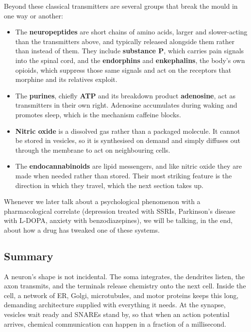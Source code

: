 \documentclass[11pt]{article}
\begin{document}
Beyond these classical transmitters are several groups that break the mould in one way or another:

\begin{itemize}
    \item The \textbf{neuropeptides} are short chains of amino acids, larger and slower-acting than the transmitters above, and typically released alongside them rather than instead of them. They include \textbf{substance P}, which carries pain signals into the spinal cord, and the \textbf{endorphins} and \textbf{enkephalins}, the body's own opioids, which suppress those same signals and act on the receptors that morphine and its relatives exploit.
    \item The \textbf{purines}, chiefly \textbf{ATP} and its breakdown product \textbf{adenosine}, act as transmitters in their own right. Adenosine accumulates during waking and promotes sleep, which is the mechanism caffeine blocks.
    \item \textbf{Nitric oxide} is a dissolved gas rather than a packaged molecule. It cannot be stored in vesicles, so it is synthesised on demand and simply diffuses out through the membrane to act on neighbouring cells.
    \item The \textbf{endocannabinoids} are lipid messengers, and like nitric oxide they are made when needed rather than stored. Their most striking feature is the direction in which they travel, which the next section takes up.
\end{itemize}

Whenever we later talk about a psychological phenomenon with a pharmacological correlate (depression treated with SSRIs, Parkinson's disease with L-DOPA, anxiety with benzodiazepines), we will be talking, in the end, about how a drug has tweaked one of these systems.

\subsection{Summary}

A neuron's shape is not incidental. The soma integrates, the dendrites listen, the axon transmits, and the terminals release chemistry onto the next cell. Inside the cell, a network of ER, Golgi, microtubules, and motor proteins keeps this long, demanding architecture supplied with everything it needs. At the synapse, vesicles wait ready and SNAREs stand by, so that when an action potential arrives, chemical communication can happen in a fraction of a millisecond.
\end{document}
